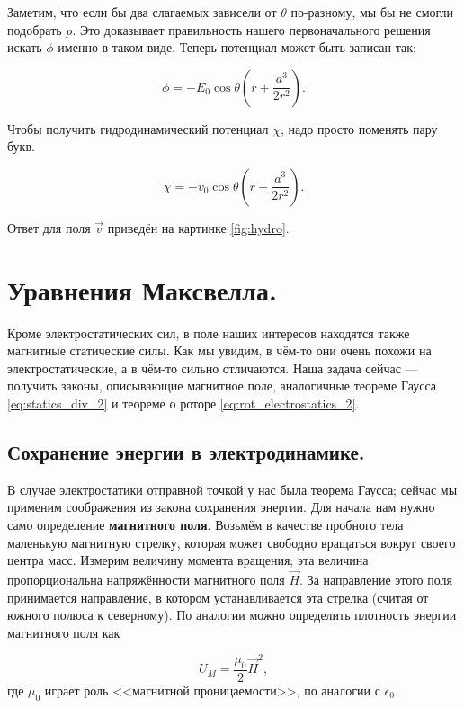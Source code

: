 \documentclass[12pt,a4paper]{article}
\numberwithin{equation}{section}
\numberwithin{equation}{section}
\newcommand{\eps}{\epsilon}
\begin{document}
Заметим, что если бы два слагаемых зависели от $\theta$ по-разному, мы
бы не смогли подобрать $p$. Это доказывает правильность нашего
первоначального решения искать $\phi$ именно в таком виде. Теперь
потенциал может быть записан так: 

\begin{equation}
  \label{eq:hydro_7}
  \phi = -E_0 \cos \theta \left(r + \frac{a^3}{2r^2} \right).
\end{equation}

Чтобы получить гидродинамический потенциал $\chi$, надо просто
поменять пару букв. 

\begin{equation}
  \label{eq:hydro_8}
  \chi = - v_0 \cos \theta \left(r + \frac{a^3}{2r^2} \right).
\end{equation}

Ответ для поля $\vec{v}$ приведён на картинке \ref{fig:hydro}.

\section{Уравнения Максвелла.}
\label{sec:maxwell}

Кроме электростатических сил, в поле наших интересов находятся также
магнитные статические силы. Как мы увидим, в чём-то они очень похожи
на электростатические, а в чём-то сильно отличаются. Наша задача
сейчас --- получить законы, описывающие магнитное поле, аналогичные
теореме Гаусса \eqref{eq:statics_div_2} и теореме о роторе
\eqref{eq:rot_electrostatics_2}. 

\subsection{Сохранение энергии в электродинамике.}
\label{sec:conservation_energy}

В случае электростатики отправной точкой у нас была теорема Гаусса;
сейчас мы применим соображения из закона сохранения энергии. Для
начала нам нужно само определение \textbf{магнитного поля}. Возьмём в
качестве пробного тела маленькую магнитную стрелку, которая может
свободно вращаться вокруг своего центра масс. Измерим величину момента
вращения; эта величина пропорциональна напряжённости магнитного поля
$\vec{H}$. За направление этого поля принимается направление, в
котором устанавливается эта стрелка (считая от южного полюса к
северному). По аналогии можно определить плотность энергии магнитного
поля как

\begin{equation}
  \label{eq:def_magnetic_energy}
  U_M = \frac{\mu_0}{2} \vec{H}^2,
\end{equation}
где $\mu_0$ играет роль <<магнитной проницаемости>>, по аналогии с
$\eps_0$. 
\end{document}
